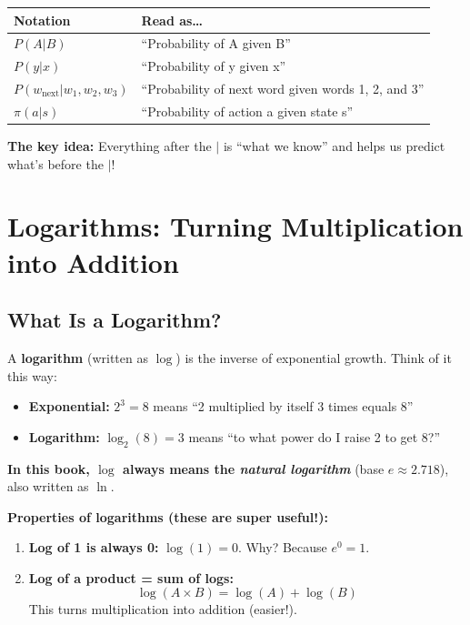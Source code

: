 \begin{chapterenv}
\begin{infobox}
\begin{center}
\begin{tabular}{ll}
\textbf{Notation} & \textbf{Read as\ldots} \\
\midrule
$P(A | B)$ & ``Probability of A given B'' \\
$P(y | x)$ & ``Probability of y given x'' \\
$P(w_{\text{next}} | w_1, w_2, w_3)$ & ``Probability of next word given words 1, 2, and 3'' \\
$\pi(a | s)$ & ``Probability of action a given state s'' \\
\end{tabular}
\end{center}

\textbf{The key idea:} Everything after the $|$ is ``what we know'' and helps us predict what's before the $|$!
\end{infobox}

\section{Logarithms: Turning Multiplication into Addition}

\subsection{What Is a Logarithm?}

A \textbf{logarithm} (written as $\log$) is the inverse of exponential growth. Think of it this way:

\begin{itemize}[nosep]
    \item \textbf{Exponential:} $2^3 = 8$ means ``2 multiplied by itself 3 times equals 8''
    \item \textbf{Logarithm:} $\log_2(8) = 3$ means ``to what power do I raise 2 to get 8?''
\end{itemize}

\textbf{In this book, $\log$ always means the \textit{natural logarithm}} (base $e \approx 2.718$), also written as $\ln$.

\begin{infobox}
\textbf{Properties of logarithms (these are super useful!):}

\begin{enumerate}[nosep]
    \item \textbf{Log of 1 is always 0:} $\log(1) = 0$. Why? Because $e^0 = 1$.

    \item \textbf{Log of a product = sum of logs:}
    \[\log(A \times B) = \log(A) + \log(B)\]
    This turns multiplication into addition (easier!).


\end{enumerate}
\end{infobox}
\end{chapterenv}
